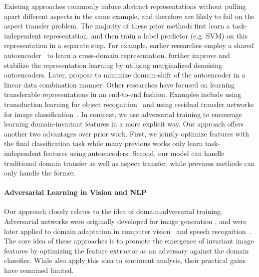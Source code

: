 Existing approaches commonly induce abstract representations without pulling apart different aspects in the same example, and therefore are likely to fail on the aspect transfer problem.
The majority of these prior methods first learn a task-independent representation, and then train a label predictor (e.g. SVM) on this representation in a separate step. 
For example, earlier researches employ a shared autoencoder~\cite{glorot2011domain,chopra2013dlid} to learn a cross-domain representation.  
 further improve and stabilize the representation learning by utilizing marginalized denoising autoencoders.
Later,  propose to minimize domain-shift of the autoencoder in a linear data combination manner.
Other researches have focused on learning transferable representations in an end-to-end fashion. Examples include using transduction learning for object recognition~\cite{sener2016learning} and using residual transfer networks for image classification~\cite{long2016unsupervised}. In contrast, we use adversarial training to encourage learning domain-invariant features in a more explicit way. Our approach offers another two advantages over prior work. First, we jointly optimize features with the final classification task while many previous works only learn task-independent features using autoencoders. Second, our model can handle traditional domain transfer as well as aspect transfer, while previous methods can only handle the former.



\paragraph{Adversarial Learning in Vision and NLP}
Our approach closely relates to the idea of domain-adversarial training. Adversarial networks were originally developed for image generation \cite{goodfellow2014generative,makhzani2015adversarial,springenberg2015unsupervised,radford2015unsupervised,taigman2016unsupervised}, and were later applied to domain adaptation in computer vision~\cite{ganin2014unsupervised,ganin2015domain,domain_separation_nets16,tzeng2014deep} and speech recognition~\cite{shinohara2016adversarial}. 
The core idea of these approaches is to promote the emergence of invariant image features by optimizing the feature extractor as an adversary against the domain classifier.
While  also apply this idea to sentiment analysis, their practical gains have remained limited. 

